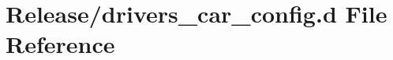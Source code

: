 \hypertarget{drivers__car__config_8d}{}\section{Release/drivers\+\_\+car\+\_\+config.d File Reference}
\label{drivers__car__config_8d}
